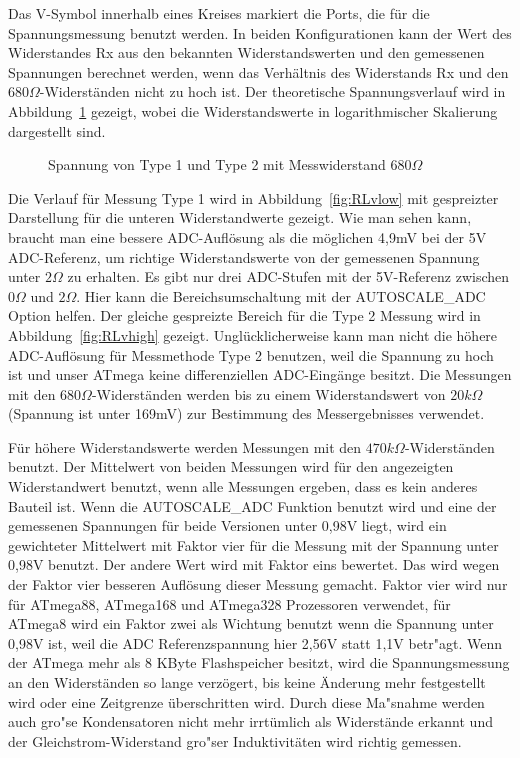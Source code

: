 Das V-Symbol innerhalb eines Kreises markiert die Ports, die f\"ur die Spannungsmessung benutzt werden.
In beiden Konfigurationen kann der Wert des Widerstandes Rx aus den bekannten Widerstandswerten
und den gemessenen Spannungen berechnet werden, wenn das Verh\"altnis des Widerstands Rx und den \(680\Omega\)-Widerst\"anden
 nicht zu hoch ist.
Der theoretische Spannungsverlauf wird in Abbildung~\ref{fig:RLvtot} gezeigt, wobei die Widerstandswerte 
in logarithmischer Skalierung dargestellt sind.
\begin{figure}[H]
\centering

\caption{Spannung von Type 1 und Type 2 mit Messwiderstand \(680\Omega\) }
\label{fig:RLvtot}
\end{figure}
Die Verlauf f\"ur Messung Type 1 wird in Abbildung~\ref{fig:RLvlow} mit gespreizter Darstellung f\"ur die unteren Widerstandwerte gezeigt.
Wie man sehen kann, braucht man eine bessere ADC-Aufl\"osung als die möglichen 4,9mV bei der 5V ADC-Referenz, um richtige
Widerstandswerte von der gemessenen Spannung unter \(2\Omega\) zu erhalten.
Es gibt nur drei ADC-Stufen mit der 5V-Referenz zwischen \(0\Omega\) und \(2\Omega\).
Hier kann die Bereichsumschaltung mit der AUTOSCALE\_ADC Option helfen.
Der gleiche gespreizte Bereich f\"ur die Type 2 Messung wird in Abbildung~\ref{fig:RLvhigh} gezeigt.
Ungl\"ucklicherweise kann man nicht die h\"ohere ADC-Aufl\"osung f\"ur Messmethode Type 2 benutzen,
weil die Spannung zu hoch ist und unser ATmega keine differenziellen ADC-Eing\"ange besitzt.
Die Messungen mit den \(680\Omega\)-Widerst\"anden werden bis zu einem Widerstandswert von 
\(20k\Omega\) (Spannung ist unter 169mV) zur Bestimmung des Messergebnisses verwendet.

F\"ur h\"ohere Widerstandswerte werden Messungen mit den \(470k\Omega\)-Widerst\"anden benutzt.
Der Mittelwert von beiden Messungen wird f\"ur den angezeigten Widerstandwert benutzt, wenn alle Messungen ergeben,
dass es kein anderes Bauteil ist.
Wenn die AUTOSCALE\_ADC Funktion benutzt wird und eine der gemessenen Spannungen f\"ur beide Versionen unter 0,98V liegt,
wird ein gewichteter Mittelwert mit Faktor vier f\"ur die Messung mit der Spannung unter 0,98V benutzt. Der andere Wert wird mit Faktor eins bewertet.
Das wird wegen der Faktor vier besseren Aufl\"osung dieser Messung gemacht.
Faktor vier wird nur f\"ur ATmega88, ATmega168 und ATmega328 Prozessoren verwendet, f\"ur ATmega8 wird ein
Faktor zwei als Wichtung benutzt wenn die Spannung unter 0,98V ist, weil die ADC Referenzspannung hier 2,56V statt 1,1V betr"agt.
Wenn der ATmega mehr als 8 KByte Flashspeicher besitzt, wird die Spannungsmessung an den Widerst\"anden so lange verz\"ogert,
bis keine \"Anderung mehr festgestellt wird oder eine Zeitgrenze \"uberschritten wird.
Durch diese Ma"snahme werden auch gro"se Kondensatoren nicht mehr irrt\"umlich als
Widerst\"ande erkannt und der Gleichstrom-Widerstand gro"ser Induktivit\"aten wird richtig gemessen.

